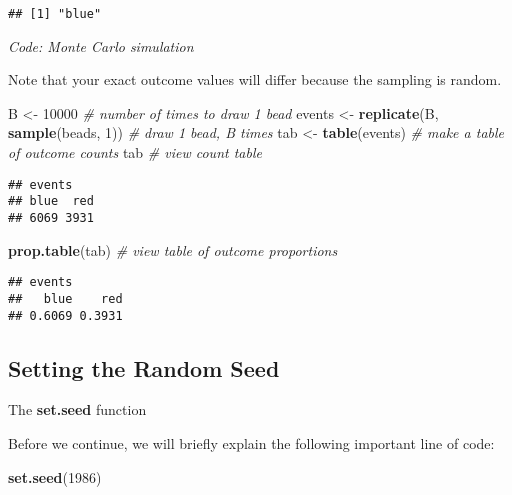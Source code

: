 \documentclass[
]{article}
\newenvironment{Shaded}{\begin{snugshade}}{\end{snugshade}}
\newcommand{\CommentTok}[1]{\textcolor[rgb]{0.56,0.35,0.01}{\textit{#1}}}
\newcommand{\DecValTok}[1]{\textcolor[rgb]{0.00,0.00,0.81}{#1}}
\newcommand{\KeywordTok}[1]{\textcolor[rgb]{0.13,0.29,0.53}{\textbf{#1}}}
\newcommand{\NormalTok}[1]{#1}
\newcommand{\StringTok}[1]{\textcolor[rgb]{0.31,0.60,0.02}{#1}}
\begin{document}
\begin{verbatim}
## [1] "blue"
\end{verbatim}

\emph{Code: Monte Carlo simulation}

Note that your exact outcome values will differ because the sampling is
random.

\begin{Shaded}
\begin{Highlighting}[]
\NormalTok{B <-}\StringTok{ }\DecValTok{10000}    \CommentTok{# number of times to draw 1 bead}
\NormalTok{events <-}\StringTok{ }\KeywordTok{replicate}\NormalTok{(B, }\KeywordTok{sample}\NormalTok{(beads, }\DecValTok{1}\NormalTok{))    }\CommentTok{# draw 1 bead, B times}
\NormalTok{tab <-}\StringTok{ }\KeywordTok{table}\NormalTok{(events)    }\CommentTok{# make a table of outcome counts}
\NormalTok{tab    }\CommentTok{# view count table}
\end{Highlighting}
\end{Shaded}

\begin{verbatim}
## events
## blue  red 
## 6069 3931
\end{verbatim}

\begin{Shaded}
\begin{Highlighting}[]
\KeywordTok{prop.table}\NormalTok{(tab)    }\CommentTok{# view table of outcome proportions}
\end{Highlighting}
\end{Shaded}

\begin{verbatim}
## events
##   blue    red 
## 0.6069 0.3931
\end{verbatim}

\hypertarget{setting-the-random-seed}{%
\subsection{Setting the Random Seed}\label{setting-the-random-seed}}

The \textbf{set.seed} function

Before we continue, we will briefly explain the following important line
of code:

\begin{Shaded}
\begin{Highlighting}[]
\KeywordTok{set.seed}\NormalTok{(}\DecValTok{1986}\NormalTok{)}
\end{Highlighting}
\end{Shaded}
\end{document}
